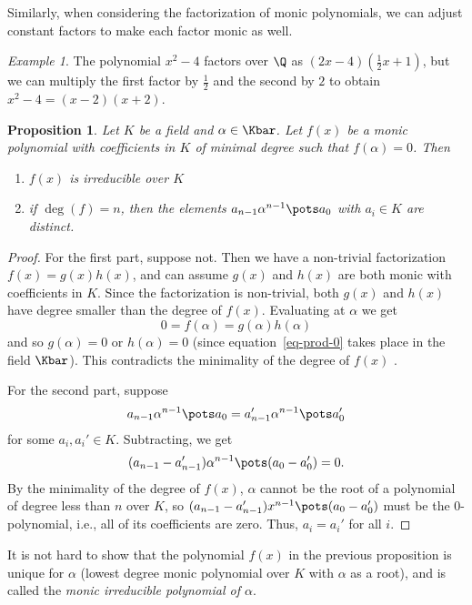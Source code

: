 \documentclass[12pt]{amsart}
\theoremstyle{plain}
\newtheorem{prop}[thm]{Proposition}
\theoremstyle{definition}
\theoremstyle{remark}
\newtheorem*{exam}{Example}
\begin{document}
Similarly, when considering the factorization of monic polynomials, we
can adjust constant factors to make each factor monic as well.
\begin{exam}
  The polynomial $x^2-4$ factors over $\Q$ as $(2x-4)(\frac12 x+1)$,
  but we can multiply the first factor by $\frac12$ and the second by
  $2$ to obtain $x^2-4=(x-2)(x+2)$.
\end{exam}
\begin{prop} \label{monicirred}
  Let $K$ be a field and $\alpha\in\Kbar$.  Let $f(x)$ be a
  monic polynomial with coefficients in $K$ of minimal degree
  such that $f(\alpha)=0$.  Then
  \begin{enumerate}
  \item $f(x)$ is irreducible over $K$
  \item if $\deg(f) = n$, then the elements $a_{n-1}\alpha^{n-1}\pots
    a_0$ with $a_i\in K$ are distinct.
  \end{enumerate}
\end{prop}
\begin{proof}
  For the first part, suppose not.  Then we have a non-trivial
  factorization $f(x)=g(x)h(x)$, and can assume $g(x)$ and $h(x)$ are
  both monic with coefficients in $K$.  Since the factorization is
  non-trivial, both $g(x)$ and $h(x)$ have degree smaller than the
  degree of $f(x)$.  Evaluating at $\alpha$ we get
  \begin{equation} \label{eq-prod-0}
    0 = f(\alpha) = g(\alpha)h(\alpha)
  \end{equation}
  and so $g(\alpha)=0$ or $h(\alpha)=0$ (since
  equation~\eqref{eq-prod-0} takes place in the field $\Kbar$).  This
  contradicts the minimality of the degree of $f(x)$ \con.

  For the second part, suppose
  \[ a_{n-1}\alpha^{n-1}\pots a_0 = a_{n-1}'\alpha^{n-1}\pots a_0'\]
  for some $a_i, a_i'\in K$.  Subtracting, we get
  \[(a_{n-1}-a_{n-1}')\alpha^{n-1}\pots (a_0-a_0')=0.\]
  By the minimality of the degree of $f(x)$, $\alpha$ cannot be the
  root of a polynomial of degree less than $n$ over $K$, so
  $(a_{n-1}-a_{n-1}')x^{n-1}\pots (a_0-a_0')$ must be the
  $0$-polynomial, i.e., all of its coefficients are zero.  Thus,
  $a_i=a_i'$ for all $i$.
\end{proof}
It is not hard to show that the polynomial $f(x)$ in the previous
proposition is unique for $\alpha$ (lowest degree monic polynomial
over $K$ with $\alpha$ as a root), and is called the \emph{monic
  irreducible polynomial of $\alpha$}.
\end{document}
